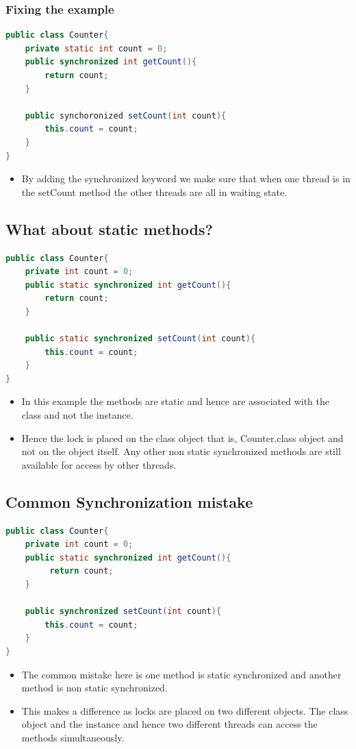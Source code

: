 \documentclass[12pt, a4paper]{book}
\begin{document}
\subsubsection{Fixing the example}
\begin{lstlisting}[language=java]
public class Counter{
	private static int count = 0;
	public synchronized int getCount(){
		return count;
	}

	public synchoronized setCount(int count){
    	this.count = count;
	}
}
\end{lstlisting}
\begin{itemize}
    \item By adding the synchronized keyword we make sure that when one thread is in the setCount method the other threads are all in waiting state.
\end{itemize}
\subsection{What about static methods?}
\begin{lstlisting}[language=java]
public class Counter{
	private int count = 0;
	public static synchronized int getCount(){
	    return count;
	}

	public static synchronized setCount(int count){
	    this.count = count;
	}
}
\end{lstlisting}
\begin{itemize}
    \item In this example the methods are static and hence are associated with the class and not the instance.
    \item Hence the lock is placed on the class object that is, Counter.class object and not on the object itself.  Any other non static synchronized methods are still available for access by other threads.
\end{itemize}
\subsection{Common Synchronization mistake}
\begin{lstlisting}[language=java]
public class Counter{
	private int count = 0;
	public static synchronized int getCount(){
		 return count;
	}

	public synchronized setCount(int count){
		this.count = count;
	}
}
\end{lstlisting}
\begin{itemize}
    \item The common mistake here is one method is static synchronized and another method is non static synchronized.
    \item This makes a difference as locks are placed on two different objects. The class object and the instance and hence two different threads can access the methods simultaneously.
\end{itemize}
\end{document}
